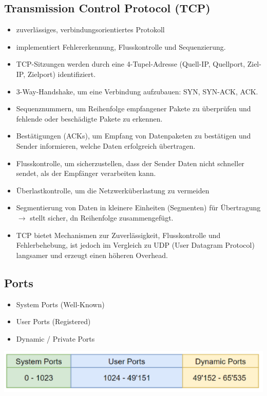 \subsection{Transmission Control Protocol (TCP)}
{

    \begin{itemize}[noitemsep]
        \item zuverlässiges, verbindungsorientiertes Protokoll
        \item implementiert Fehlererkennung, Flusskontrolle und Sequenzierung.
        \item TCP-Sitzungen werden durch eine 4-Tupel-Adresse (Quell-IP, Quellport, Ziel-IP, Zielport) identifiziert.
        \item 3-Way-Handshake, um eine Verbindung aufzubauen: SYN, SYN-ACK, ACK.

        \item  Sequenznummern, um  Reihenfolge empfangener Pakete zu überprüfen und fehlende oder beschädigte Pakete zu erkennen.
        \item Bestätigungen (ACKs), um  Empfang von Datenpaketen zu bestätigen und  Sender informieren, welche Daten erfolgreich übertragen.
        \item Flusskontrolle, um sicherzustellen, dass der Sender Daten nicht schneller sendet, als der Empfänger verarbeiten kann.
        \item Überlastkontrolle, um die Netzwerküberlastung zu vermeiden
        \item Segmentierung von Daten in kleinere Einheiten (Segmenten) für  Übertragung $\to$ stellt sicher, dn Reihenfolge zusammengefügt.
        \item TCP bietet Mechanismen zur Zuverlässigkeit, Flusskontrolle und Fehlerbehebung, ist jedoch im Vergleich zu UDP (User Datagram Protocol) langsamer und erzeugt einen höheren Overhead.
    \end{itemize}
}


\subsection{Ports}
{
    \begin{itemize}[noitemsep]
        \item System Ports (Well-Known)
        \item User Ports (Registered)
        \item Dynamic / Private Ports
    \end{itemize}

    \includegraphics[scale=.45]{img/ports.png}


}


